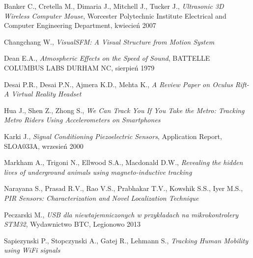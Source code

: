 \begin{thebibliography}{99}


   Banker C., Cretella M., Dimaria J., Mitchell J., Tucker J., 
  \textit{Ultrasonic 3D Wireless Computer Mouse}, 
  Worcester Polytechnic Institute Electrical and Computer Engineering Department, kwiecień 2007 

     Changchang W.,
  \textit{VisualSFM: A Visual Structure from Motion System}

      Dean E.A., \textit{Atmospheric Effects on the Speed of Sound}, 
  BATTELLE COLUMBUS LABS DURHAM NC, sierpień 1979

   Desai P.R., Desai P.N., Ajmera K.D., Mehta K.,
  \textit{A Review Paper on Oculus Rift-A Virtual Reality Headset}

     Hua J., Shen Z., Zhong S., 
  \textit{We Can Track You If You Take the Metro: Tracking Metro Riders Using Accelerometers on Smartphones}

  
   Karki J., \textit{Signal Conditioning Piezoelectric Sensors}, 
  Application Report, SLOA033A, wrzesień 2000

     Markham A., Trigoni N., Ellwood S.A., Macdonald D.W.,
  \textit{Revealing the hidden lives of underground animals using magneto-inductive tracking}

     Narayana S., Prasad R.V., Rao V.S., Prabhakar  T.V., Kowshik S.S., Iyer M.S.,
  \textit{PIR Sensors: Characterization and Novel Localization Technique}

     Peczarski M., 
  \textit{USB dla niewtajemniczonych w przykładach na mikrokontrolery STM32}, Wydawnictwo BTC, Legionowo 2013


     Sapiezynski P., Stopczynski A., Gatej R., Lehmann S.,
  \textit{Tracking Human Mobility using WiFi signals} 


\end{thebibliography}
